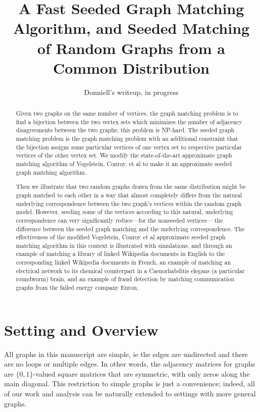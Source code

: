 \documentclass[12pt]{article}
\begin{document}
\title{A Fast Seeded Graph Matching Algorithm, and Seeded Matching of
Random Graphs from a Common Distribution}
\author{Donniell's writeup, in progress}

\maketitle
\begin{abstract} Given two graphs on the same number of vertices,
the graph matching problem is to find a bijection between the
two vertex sets which minimizes the number of adjacency disagreements
between the two graphs; this problem is NP-hard. The seeded graph
matching problem is the graph matching problem with an additional
constraint that the bijection assigns some particular vertices of
one vertex set to respective particular vertices of the other
vertex set. We modify the state-of-the-art approximate graph matching
algorithm of Vogelstein, Conroy, et al to make it an approximate
seeded graph matching algorithm.

Then we illustrate that two random graphs drawn from the same
distribution might be graph matched to each other in a way
that almost completely differs from the natural underlying
correspondence between the two graph's vertices within the
random graph model. However, seeding some of the vertices
according to this natural, underlying correspondence can
very significantly reduce---for the nonseeded vertices---
the difference between the seeded graph matching 
and the underlying correspondence. 
The effectiveness of the modified Vogelstein, Conroy et al 
approximate seeded graph matching algorithm in this context 
is illustrated with simulations, and through an example
of matching a library of linked Wikipedia documents in English to
the corresponding linked Wikipedia documents in French, an example
of matching an electrical network to its chemical counterpart in
a Caenorhabditis elegans (a particular roundworm) brain, and an example
of fraud detection by matching communication graphs from the failed
energy company Enron.
\end{abstract}

\newpage


\section{Setting and Overview}

All graphs in this manuscript are simple, ie the edges are undirected and
there are no loops or multiple edges. In other words, the adjacency matrices
for graphs are $\{ 0,1 \}$-valued square matrices that
are symmetric, with only zeros along the main diagonal.
This restriction to simple graphs is just a convenience; indeed,
all of our work and analysis can be naturally extended to settings
with more general graphs.
\end{document}
